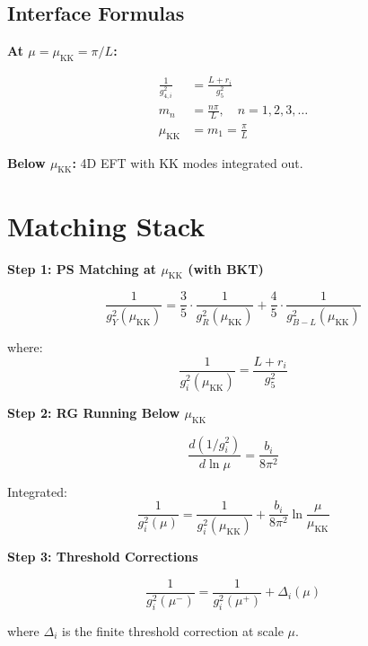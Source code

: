 \documentclass[11pt,a4paper]{article}
\begin{document}
\subsection{Interface Formulas}
\label{subsec:interface}

\textbf{At $\mu = \mu_{\text{KK}} = \pi/L$:}

\begin{align}
\label{eq:g4-from-g5}
\frac{1}{g_{4,i}^2} &= \frac{L + r_i}{g_5^2} \\
\label{eq:kk-mass-spectrum}
m_n &= \frac{n\pi}{L}, \quad n = 1, 2, 3, \ldots \\
\label{eq:mu-kk-def}
\mu_{\text{KK}} &= m_1 = \frac{\pi}{L}
\end{align}

\textbf{Below $\mu_{\text{KK}}$:} 4D EFT with KK modes integrated out.

\section{Matching Stack}
\label{sec:matching-stack}

\begin{tcolorbox}[colback=green!5!white,colframe=green!60!black,title=\textbf{MATCHING STACK (Boxed)}]

\textbf{Step 1: PS Matching at $\mu_{\text{KK}}$ (with BKT)}

\begin{equation}
\label{eq:ps-matching-bkt}
\boxed{\frac{1}{g_Y^2(\mu_{\text{KK}})} = \frac{3}{5} \cdot \frac{1}{g_R^2(\mu_{\text{KK}})} + \frac{4}{5} \cdot \frac{1}{g_{B-L}^2(\mu_{\text{KK}})}}
\end{equation}

where:
\begin{equation}
\label{eq:couplings-at-kk}
\frac{1}{g_i^2(\mu_{\text{KK}})} = \frac{L + r_i}{g_5^2}
\end{equation}

\textbf{Step 2: RG Running Below $\mu_{\text{KK}}$}

\begin{equation}
\label{eq:rg-running}
\boxed{\frac{d(1/g_i^2)}{d\ln\mu} = \frac{b_i}{8\pi^2}}
\end{equation}

Integrated:
\begin{equation}
\label{eq:rg-integrated}
\frac{1}{g_i^2(\mu)} = \frac{1}{g_i^2(\mu_{\text{KK}})} + \frac{b_i}{8\pi^2}\ln\frac{\mu}{\mu_{\text{KK}}}
\end{equation}

\textbf{Step 3: Threshold Corrections}

\begin{equation}
\label{eq:threshold-general}
\boxed{\frac{1}{g_i^2(\mu^-)} = \frac{1}{g_i^2(\mu^+)} + \Delta_i(\mu)}
\end{equation}

where $\Delta_i$ is the finite threshold correction at scale $\mu$.

\end{tcolorbox}
\end{document}
